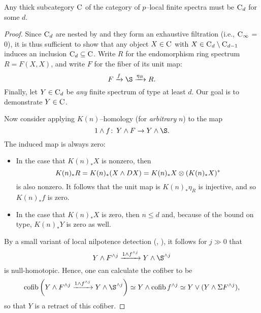 \begin{theorem}\label{ThickSubcatClassification}
Any thick subcategory \(\normalfont\textsc{C}\) of the category of \(p\)--local finite spectra must be \(\normalfont\textsc{C}_d\) for some \(d\).
\end{theorem}
\begin{proof}
Since \(\normalfont\textsc{C}_d\) are nested by  and they form an exhaustive filtration (i.e., \(\normalfont\textsc{C}_\infty\) = 0), it is thus sufficient to show that any object \(X \in \normalfont\textsc{C}\) with \(X \in \normalfont\textsc{C}_d \setminus \normalfont\textsc{C}_{d-1}\) induces an inclusion \(\normalfont\textsc{C}_d \subseteq \normalfont\textsc{C}\).  Write \(R\) for the endomorphism ring spectrum \(R = F(X, X)\), and write \(F\) for the fiber of its unit map: \[F \xrightarrow{f} \S \xrightarrow{\eta_R} R.\]  Finally, let \(Y \in \normalfont\textsc{C}_d\) be \emph{any} finite spectrum of type at least \(d\).  Our goal is to demonstrate \(Y \in \normalfont\textsc{C}\).  

Now consider applying \(K(n)\)--homology (for \emph{arbitrary} \(n\)) to the map \[1 \sm f\co Y \sm F \to Y \sm \S.\]  The induced map is always zero:
\begin{itemize}
\item In the case that \(K(n)_* X\) is nonzero, then \[K(n)_* R = K(n)_* (X \wedge DX) = K(n)_* X \otimes (K(n)_* X)^*\] is also nonzero.  It follows that the unit map is \(K(n)_* \eta_R\) is injective, and so \(K(n)_* f\) is zero.
\item In the case that \(K(n)_* X\) is zero, then \(n \le d\) and, because of the bound on type, \(K(n)_* Y\) is zero as well.
\end{itemize}
By a small variant of local nilpotence detection (, \cite[Corollary 2.5]{HopkinsSmith}), it follows for \(j \gg 0\) that \[Y \sm F^{\sm j} \xrightarrow{1 \sm f^{\sm j}} Y \sm \S^{\sm j}\] is null-homotopic.  Hence, one can calculate the cofiber to be \[\cofib\left( Y \sm F^{\sm j} \xrightarrow{1 \sm f^{\sm j}} Y \sm \S^{\sm j} \right) \simeq Y \sm \cofib f^{\sm j} \simeq Y \vee (Y \sm \Susp F^{\sm j}),\] so that \(Y\) is a retract of this cofiber.


\end{proof}
